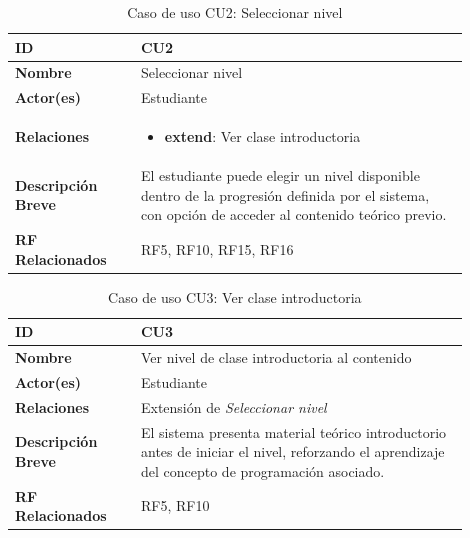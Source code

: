 \begin{table}[H]
\centering
\begin{tabular}{|p{0.25\linewidth}|p{0.65\linewidth}|}
\hline
\textbf{ID} & CU2 \\
\hline
\textbf{Nombre} & Seleccionar nivel \\
\hline
\textbf{Actor(es)} & Estudiante \\
\hline
\textbf{Relaciones} & 
\begin{itemize}
    \item \textbf{extend}: Ver clase introductoria
\end{itemize} \\
\hline
\textbf{Descripción Breve} & El estudiante puede elegir un nivel disponible dentro de la progresión definida por el sistema, con opción de acceder al contenido teórico previo. \\
\hline
\textbf{RF Relacionados} & RF5, RF10, RF15, RF16 \\
\hline
\end{tabular}
\caption{Caso de uso CU2: Seleccionar nivel}
\end{table}

\begin{table}[H]
\centering
\begin{tabular}{|p{0.25\linewidth}|p{0.65\linewidth}|}
\hline
\textbf{ID} & CU3 \\
\hline
\textbf{Nombre} & Ver nivel de clase introductoria al contenido \\
\hline
\textbf{Actor(es)} & Estudiante \\
\hline
\textbf{Relaciones} & Extensión de \textit{Seleccionar nivel} \\
\hline
\textbf{Descripción Breve} & El sistema presenta material teórico introductorio antes de iniciar el nivel, reforzando el aprendizaje del concepto de programación asociado. \\
\hline
\textbf{RF Relacionados} & RF5, RF10 \\
\hline
\end{tabular}
\caption{Caso de uso CU3: Ver clase introductoria}
\end{table}

